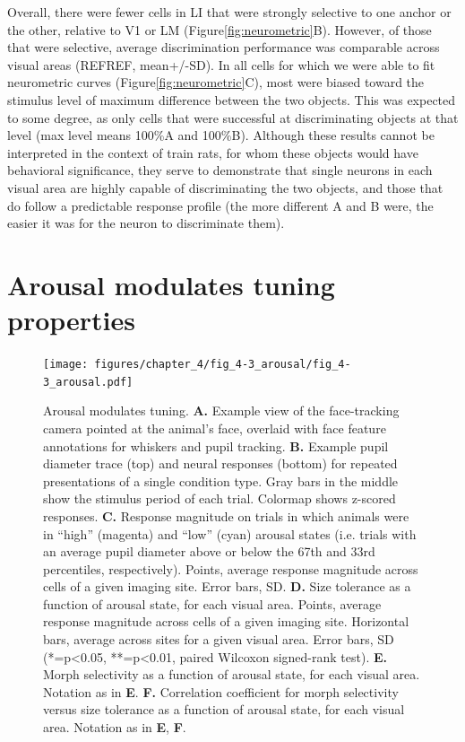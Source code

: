Overall, there were fewer cells in LI that were strongly selective to one anchor or the other, relative to V1 or LM (Figure\ref{fig:neurometric}B). However, of those that were selective, average discrimination performance was comparable across visual areas (REFREF, mean+/-SD). In all cells for which we were able to fit neurometric curves (Figure\ref{fig:neurometric}C), most were biased toward the stimulus level of maximum difference between the two objects. This was expected to some degree, as only cells that were successful at discriminating objects at that level (max level means 100\%A and 100\%B). Although these results cannot be interpreted in the context of train rats, for whom these objects would have behavioral significance, they serve to demonstrate that single neurons in each visual area are highly capable of discriminating the two objects, and those that do follow a predictable response profile (the more different A and B were, the easier it was for the neuron to discriminate them).  


\section{Arousal modulates tuning properties} 
\begin{figure}[t!]
    \texttt{[image: figures/chapter\_4/fig\_4-3\_arousal/fig\_4-3\_arousal.pdf]}
    \caption[Arousal modulates tuning]{Arousal modulates tuning. 
    \textbf{A.} Example view of the face-tracking camera pointed at the animal’s face, overlaid with face feature annotations for whiskers and pupil tracking.
    \textbf{B.} Example pupil diameter trace (top) and neural responses (bottom) for repeated presentations of a single condition type. Gray bars in the middle show the stimulus period of each trial. Colormap shows z-scored responses.
    \textbf{C.} Response magnitude on trials in which animals were in “high” (magenta) and “low” (cyan) arousal states (i.e. trials with an average pupil diameter above or below the 67th and 33rd percentiles, respectively). Points, average response magnitude across cells of a given imaging site. Error bars, SD.
    \textbf{D.} Size tolerance as a function of arousal state, for each visual area. Points, average response magnitude across cells of a given imaging site. Horizontal bars, average across sites for a given visual area. Error bars, SD (*=p<0.05, **=p<0.01, paired Wilcoxon signed-rank test).
    \textbf{E.} Morph selectivity as a function of arousal state, for each visual area. Notation as in \textbf{E}.
    \textbf{F.} Correlation coefficient for morph selectivity versus size tolerance as a function of arousal state, for each visual area. Notation as in \textbf{E}, \textbf{F}.
    \label{fig:arousal}}
\end{figure}


